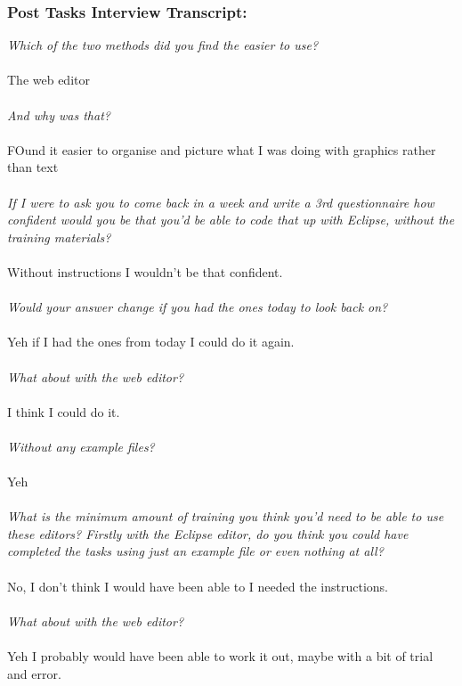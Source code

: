 \documentclass{report}
\begin{document}
\subsubsection*{Post Tasks Interview Transcript:}
\textit{Which of the two methods did you find the easier to use?}
\\
\\
The web editor
\\
\\
\textit{And why was that?}
\\
\\
FOund it easier to organise and picture what I was doing with graphics rather than text
\\
\\
\textit{If I were to ask you to come back in a week and write a 3rd questionnaire how confident would you be that you'd be able to code that up with Eclipse, without the training materials?}
\\
\\
Without instructions I wouldn't be that confident.
\\
\\
\textit{Would your answer change if you had the ones today to look back on?}
\\
\\
Yeh if I had the ones from today I could do it again.\\
\\
\textit{What about with the web editor?}
\\
\\
I think I could do it.
\\
\\
\textit{Without any example files?}
\\
\\
Yeh
\\
\\
\textit{What is the minimum amount of training you think you'd need to be able to use these editors? Firstly with the Eclipse editor, do you think you could have completed the tasks using just an example file or even nothing at all?}
\\
\\
No, I don't think I would have been able to I needed the instructions.
\\
\\
\textit{What about with the web editor?}
\\
\\
Yeh I probably would have been able to work it out, maybe with a bit of trial and error.
\end{document}
